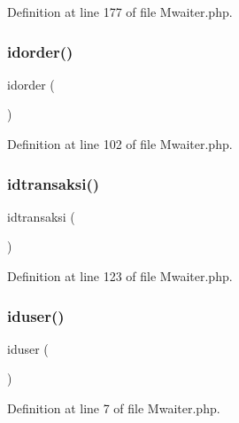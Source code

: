 Definition at line 177 of file Mwaiter.\+php.

\mbox{\label{class_mwaiter_a609d55790b70e6c172ee10588e0c8453}} 
\subsubsection{\texorpdfstring{idorder()}{idorder()}}
{\footnotesize\ttfamily idorder (\begin{DoxyParamCaption}{ }\end{DoxyParamCaption})}



Definition at line 102 of file Mwaiter.\+php.

\mbox{\label{class_mwaiter_a5a1657a2dffccf36eb0efe5d7f83bd5a}} 
\subsubsection{\texorpdfstring{idtransaksi()}{idtransaksi()}}
{\footnotesize\ttfamily idtransaksi (\begin{DoxyParamCaption}{ }\end{DoxyParamCaption})}



Definition at line 123 of file Mwaiter.\+php.

\mbox{\label{class_mwaiter_ae585015ef84ce17375a2e7a05797b74d}} 
\subsubsection{\texorpdfstring{iduser()}{iduser()}}
{\footnotesize\ttfamily iduser (\begin{DoxyParamCaption}{ }\end{DoxyParamCaption})}



Definition at line 7 of file Mwaiter.\+php.

\mbox{\label{class_mwaiter_a8f5325239f2561a5609cd78afd4122e4}} 
